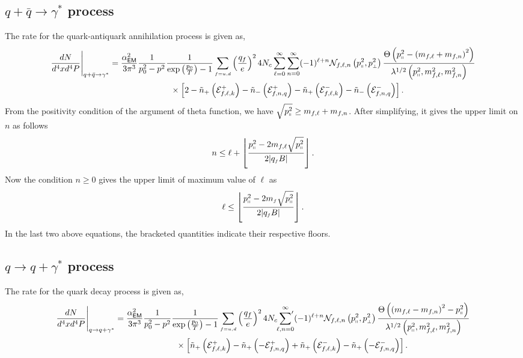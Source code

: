 \documentclass[aps,prd,floatfix,showpacs,showkeys,superscriptadress,unsortedaddress,nofootinbib,onecolumn]{revtex4-1}
\newcommand{\sF}{\scriptscriptstyle{f}}
\newcommand{\sperp}{\scriptscriptstyle{\perp}}
\newcommand{\shp}{\shortparallel}
\newcommand{\nn}{\nonumber \\}
\begin{document}
\subsection{$q+\bar{q}\rightarrow \gamma^*$ process}

The rate for the quark-antiquark annihilation process is given as,
\begin{align}
& \frac{dN}{d^4xd^4P}\Bigg\vert_{q+\bar{q}\rightarrow \gamma^*} =\frac{\alpha_{\textsf{EM}}^2}{3\pi^3}\frac{1}{p_0^2-p^2}\frac{1}{\exp\left(\frac{p_0}{T}\right)-1}\sum_{\sF=u,d}\left(\frac{q_{f}}{e}\right)^24N_c\sum_{\ell=0}^{\infty}\sum_{n=0}^{\infty}(-1)^{\ell+n}\mathcal{N}_{f,\ell,n}\left(p^2_{\shp},p_{\sperp}^2\right)\frac{\Theta\left(p_{\shp}^2-\left(m_{f,\ell}+m_{f,n}\right)^2\right)}{\lambda^{1/2}\left(p_{\shp}^2,m^2_{f,\ell},m^2_{f,n}\right)}\nn
&\hspace*{5cm}\times\left[2-\tilde{n}_{+}\left(\mathcal{E}^{+}_{f,\ell,k}\right)
-\tilde{n}_{-}\left(\mathcal{E}^{+}_{f,n,q}\right)-\tilde{n}_{+}\left(\mathcal{E}^{-}_{f,\ell,k}\right)
-\tilde{n}_{-}\left(\mathcal{E}^{-}_{f,n,q}\right)\right].
\end{align}
From the positivity condition of the argument of theta function, we have $\sqrt{p_{\shp}^2}\geq m_{f,\ell}+m_{f,n}$.  After simplifying, it gives the upper limit on $n$ as follows
\begin{align}
n\leq \ell +\left\lfloor\frac{p_{\shp}^2-2m_{f,\ell}\sqrt{p_{\shp}^2}}{2|q_{\sF}B|}\right\rfloor .
\end{align}
Now the condition $n\geq 0$ gives the upper limit of maximum value of $\ell$ as
\begin{align}
\ell \leq \left\lfloor\frac{p_{\shp}^2-2m_{\sF}\sqrt{p_{\shp}^2}}{2|q_{\sF}B|}\right\rfloor .
\end{align}
In the last two above equations, the bracketed quantities indicate their respective floors.
\subsection{$q\rightarrow q+\gamma^*$ process}

The rate for the quark decay process is given as, 
\begin{align}
& \frac{dN}{d^4xd^4P}\Bigg\vert_{q\rightarrow q+\gamma^*} =\frac{\alpha_{\textsf{EM}}^2}{3\pi^3}\frac{1}{p_0^2-p^2}\frac{1}{\exp\left(\frac{p_0}{T}\right)-1}\sum_{\sF=u,d}\left(\frac{q_{f}}{e}\right)^24N_c\sideset{}{'}\sum_{\ell,n=0}^{\infty}(-1)^{\ell+n}\mathcal{N}_{f,\ell,n}\left(p^2_{\shp},p_{\sperp}^2\right)\frac{\Theta\left(\left(m_{f,\ell}-m_{f,n}\right)^2-p_{\shp}^2\right)}{\lambda^{1/2}\left(p_{\shp}^2,m^2_{f,\ell},m^2_{f,n}\right)}\nn
&\hspace{5cm}\times\left[\tilde{n}_{+}\left(\mathcal{E}^{+}_{f,\ell,k}\right)-\tilde{n}_{+}\left(-\mathcal{E}^{+}_{f,n,q}\right)+\tilde{n}_{+}\left(\mathcal{E}^{-}_{f,\ell,k}\right)-\tilde{n}_{+}\left(-\mathcal{E}^{-}_{f,n,q}\right)\right].
\end{align}
\end{document}

